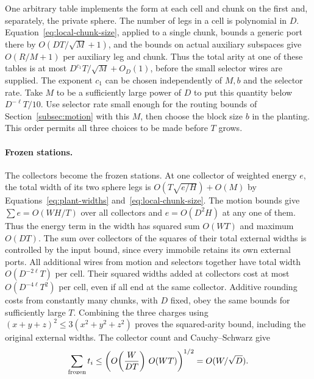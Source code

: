 One arbitrary table implements the form at each cell and chunk on the
first and, separately, the private sphere. The number of legs in a cell
is polynomial in \(D\). Equation~\eqref{eq:local-chunk-size}, applied
to a single chunk, bounds a generic port there by \(O(DT/\sqrt M+1)\),
and the bounds on actual auxiliary subspaces give \(O(R/M+1)\) per
auxiliary leg and chunk. Thus the total arity at one of these tables is
at most \(D^{c_1}T/\sqrt M+O_D(1)\), before the small selector wires
are supplied. The exponent \(c_1\) can be chosen independently of
\(M,b\) and the selector rate. Take \(M\) to be a sufficiently large
power of \(D\) to put this quantity below \(D^{-\ell}T/10\). Use
selector rate small enough for the routing bounds of
Section~\ref{subsec:motion} with this \(M\), then choose the block
size \(b\) in the planting. This order permits all three choices to be
made before \(T\) grows.

\paragraph{Frozen stations.}
The collectors become the frozen stations. At one collector of weighted
energy \(e\), the total width of its two sphere legs is
\(O(T\sqrt{e/H})+O(M)\) by Equations~\eqref{eq:plant-widths}
and~\eqref{eq:local-chunk-size}. The motion bounds give
\(\sum e=O(WH/T)\) over all collectors and \(e=O(D^2H)\) at any
one of them. Thus the energy term in the width has squared sum \(O(WT)\)
and maximum \(O(DT)\). The sum over collectors of the squares of their total external widths
is controlled by the input bound, since every immobile retains its own
external ports. All additional wires from motion and selectors together
have total width \(O(D^{-2\ell}T)\) per cell. Their squared widths added at
collectors cost at most \(O(D^{-4\ell}T^2)\) per cell, even if all
end at the same collector. Additive rounding costs from constantly
many chunks, with \(D\) fixed, obey the same bounds for sufficiently
large \(T\). Combining the three charges using
\((x+y+z)^2\le3(x^2+y^2+z^2)\) proves the squared-arity bound, including
the original external widths. The collector count and Cauchy--Schwarz give
\[
 \sum_{\rm frozen}t_i\le
 \left(O\!\left(\frac W{DT}\right)\,O(WT)\right)^{1/2}
 =O(W/\sqrt D).
\]

